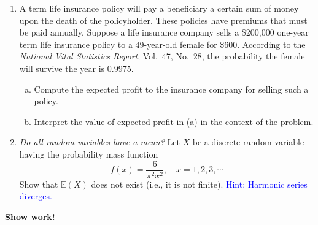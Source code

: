 \documentclass[12pt]{article}
\begin{document}
\begin{enumerate}
  \item A term life insurance policy will pay a beneficiary a certain sum of money upon the death of the policyholder. These policies have premiums that must be paid annually. Suppose a life insurance company sells a \$200,000 one-year term life insurance policy to a 49-year-old female for \$600. According to the \textit{National Vital Statistics Report}, Vol.~47, No.~28, the probability the female will survive the year is 0.9975.
    \begin{enumerate}[(a)]
      \item Compute the expected profit to the insurance company for selling such a policy.
      \item Interpret the value of expected profit in (a) in the context of the problem.
    \end{enumerate}

  \item \textit{Do all random variables have a mean?} Let $X$ be a discrete random variable having the probability mass function
    \[
      f(x) = \frac{6}{\pi^2 x^2}, \quad x = 1, 2, 3, \cdots
    \]
    Show that $\mathbb{E}(X)$ does not exist (i.e., it is not finite). \hfill \textcolor{blue}{Hint: Harmonic series diverges.}
\end{enumerate}

\begin{center}
  \textbf{\large Show work!}
\end{center}
\end{document}
